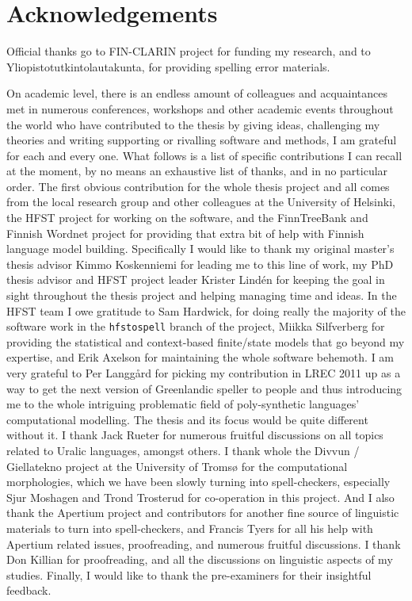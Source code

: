 \documentclass[officiallayout,final]{unihelcompling}
\begin{document}
\section*{Acknowledgements}
\label{sec:acknowledgements}

Official thanks go to FIN-CLARIN project for funding my research, and to
Yliopistotutkintolautakunta, for providing spelling error materials.

On academic level, there is an endless amount of colleagues and acquaintances
met in numerous conferences, workshops and other academic events throughout the
world who have contributed to the thesis by giving ideas, challenging my
theories and writing supporting or rivalling software and methods, I am
grateful for each and every one. What follows is a list of specific
contributions I can recall at the moment, by no means an exhaustive list of
thanks, and in no particular order.  The first obvious contribution for the
whole thesis project and all comes from the local research group and other
colleagues at the University of Helsinki, the HFST project for working on the
software, and the FinnTreeBank and Finnish Wordnet project for providing that
extra bit of help with Finnish language model building. Specifically I would
like to thank my original master's thesis advisor Kimmo Koskenniemi for leading
me to this line of work, my PhD thesis advisor and HFST project leader Krister
Lindén for keeping the goal in sight throughout the thesis project and helping
managing time and ideas.  In the HFST team I owe gratitude to Sam Hardwick, for
doing really the majority of the software work in the \texttt{hfstospell}
branch of the project, Miikka Silfverberg for providing the statistical and
context-based finite\-/state models that go beyond my expertise, and Erik
Axelson for maintaining the whole software behemoth.  I am very grateful to Per
Langgård for picking my contribution in LREC 2011 up as a way to get the next
version of Greenlandic speller to people and thus introducing me to the whole
intriguing problematic field of poly-synthetic languages' computational
modelling. The thesis and its focus would be quite different without it.  I
thank Jack Rueter for numerous fruitful discussions on all topics related to
Uralic languages, amongst others.  I thank whole the Divvun / Giellatekno
project at the University of Tromsø for the computational morphologies, which
we have been slowly turning into spell-checkers, especially Sjur Moshagen and
Trond Trosterud for co-operation in this project. And I also thank the Apertium
project and contributors for another fine source of linguistic materials to
turn into spell-checkers, and Francis Tyers for all his help with Apertium
related issues, proofreading, and numerous fruitful discussions. I thank Don
Killian for proofreading, and all the discussions on linguistic aspects of
my studies. Finally, I would like to thank the pre-examiners for their
insightful feedback.
\end{document}
